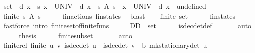 \begin{isabellebody}
\ {\isacharquery}{\kern0pt}set\ {\isacharequal}{\kern0pt}\ {\isachardoublequoteopen}{\isacharbraceleft}{\kern0pt}d{\isachardot}{\kern0pt}\ {\isasymforall}x\ {\isacharcolon}{\kern0pt}{\isacharcolon}{\kern0pt}\ {\isacharprime}{\kern0pt}s{\isachardot}{\kern0pt}\ {\isacharparenleft}{\kern0pt}x\ {\isasymin}\ UNIV\ {\isasymlongrightarrow}\ d\ x\ {\isasymin}\ {\isacharparenleft}{\kern0pt}{\isasymUnion}s{\isachardot}{\kern0pt}\ A\ s{\isacharparenright}{\kern0pt}{\isacharparenright}{\kern0pt}\ {\isasymand}\ {\isacharparenleft}{\kern0pt}x\ {\isasymnotin}\ UNIV\ {\isasymlongrightarrow}\ d\ x\ {\isacharequal}{\kern0pt}\ undefined{\isacharparenright}{\kern0pt}{\isacharbraceright}{\kern0pt}{\isachardoublequoteclose}\isanewline
\ \ \isamarkupfalse%
\ {\isachardoublequoteopen}finite\ {\isacharparenleft}{\kern0pt}{\isasymUnion}s{\isachardot}{\kern0pt}\ A\ s{\isacharparenright}{\kern0pt}{\isachardoublequoteclose}\isanewline
\ \ \ \ \isamarkupfalse%
\ fin{\isacharunderscore}{\kern0pt}actions\ fin{\isacharunderscore}{\kern0pt}states\ \isamarkupfalse%
\ blast\isanewline
\ \ \isamarkupfalse%
\ {\isachardoublequoteopen}finite\ {\isacharquery}{\kern0pt}set{\isachardoublequoteclose}\isanewline
\ \ \ \ \isamarkupfalse%
\ fin{\isacharunderscore}{\kern0pt}states\isanewline
\ \ \ \ \isamarkupfalse%
\ {\isacharparenleft}{\kern0pt}fastforce\ intro{\isacharcolon}{\kern0pt}\ finite{\isacharunderscore}{\kern0pt}set{\isacharunderscore}{\kern0pt}of{\isacharunderscore}{\kern0pt}finite{\isacharunderscore}{\kern0pt}funs{\isacharparenright}{\kern0pt}\isanewline
\ \ \isamarkupfalse%
\ \isamarkupfalse%
\ {\isachardoublequoteopen}D\isactrlsub D\ {\isasymsubseteq}\ {\isacharquery}{\kern0pt}set{\isachardoublequoteclose}\isanewline
\ \ \ \ \isamarkupfalse%
\ is{\isacharunderscore}{\kern0pt}dec{\isacharunderscore}{\kern0pt}det{\isacharunderscore}{\kern0pt}def\ \isanewline
\ \ \ \ \isamarkupfalse%
\ auto\isanewline
\ \ \isamarkupfalse%
\ \isamarkupfalse%
\ {\isacharquery}{\kern0pt}thesis\isanewline
\ \ \ \ \isamarkupfalse%
\ finite{\isacharunderscore}{\kern0pt}subset\ \isanewline
\ \ \ \ \isamarkupfalse%
\ auto\isanewline
{}\isamarkupfalse%
%
\endisatagproof
{\isafoldproof}%
%
\isadelimproof
\isanewline
%
\endisadelimproof
\isanewline
{}\isamarkupfalse%
\ finite{\isacharunderscore}{\kern0pt}rel{\isacharcolon}{\kern0pt}\ {\isachardoublequoteopen}finite\ {\isacharbraceleft}{\kern0pt}{\isacharparenleft}{\kern0pt}u{\isacharcomma}{\kern0pt}\ v{\isacharparenright}{\kern0pt}{\isachardot}{\kern0pt}\ is{\isacharunderscore}{\kern0pt}dec{\isacharunderscore}{\kern0pt}det\ u\ {\isasymand}\ is{\isacharunderscore}{\kern0pt}dec{\isacharunderscore}{\kern0pt}det\ v\ {\isasymand}\ {\isasymnu}\isactrlsub b\ {\isacharparenleft}{\kern0pt}mk{\isacharunderscore}{\kern0pt}stationary{\isacharunderscore}{\kern0pt}det\ u{\isacharparenright}{\kern0pt}\ {\isachargreater}{\kern0pt}\ \isanewline

\end{isabellebody}
